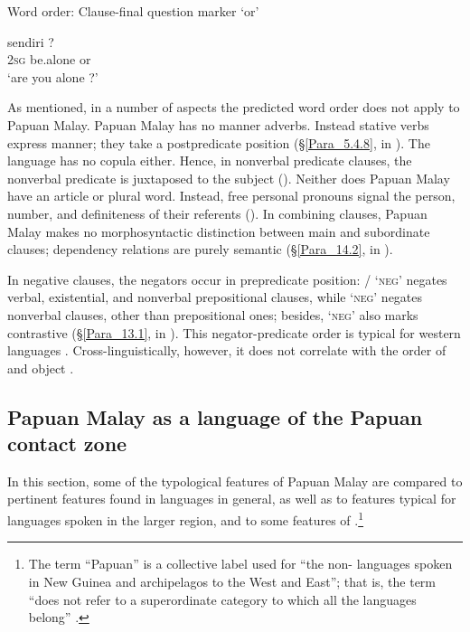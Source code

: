 \begin{styleExampleTitle}
{Word order: Clause-final question marker  ‘or’}
\end{styleExampleTitle}
\ea
\label{Example_1.12}
 {sendiri} {?}\\ %
\textsc{2sg}  be.alone or\\

\glt 
‘are you alone ?’ \textstyleExampleSource{[080921-010-Cv.0003]}
\z


As mentioned, in a number of aspects the predicted word order does not apply to Papuan Malay. Papuan Malay has no manner adverbs. Instead  stative verbs express manner; they take a postpredicate position (§\ref{Para_5.4.8}, in ). The language has no copula either. Hence, in nonverbal predicate clauses, the nonverbal predicate is juxtaposed to the subject (). Neither does Papuan Malay have an article or plural word. Instead, free personal pronouns signal the person, number, and definiteness of their referents (). In combining clauses, Papuan Malay makes no morphosyntactic distinction between main and subordinate clauses; dependency relations are purely semantic (§\ref{Para_14.2}, in ).



In negative clauses, the negators occur in prepredicate position: / ‘\textsc{neg}’ negates verbal, existential, and nonverbal prepositional clauses, while  ‘\textsc{neg}’ negates nonverbal clauses, other than prepositional ones; besides,  ‘\textsc{neg}’ also marks contrastive  (§\ref{Para_13.1}, in ). This negator-predicate order is typical for western  languages \citep[141]{Himmelmann.2005}. Cross-linguistically, however, it does not correlate with the order of  and object \citep[130]{Dryer.2007c}.


\subsection{Papuan Malay as a language of the Papuan contact zone}\label{Para_1.6.2}
In this section, some of the typological features of Papuan Malay are compared to pertinent features found in  languages in general, as well as to features typical for  languages spoken in the larger region, and to some features of .\footnote{\label{Footnote_1.24}The term  ``Papuan'' is a collective label used for  ``the non- languages spoken in New Guinea and archipelagos to the West and East''; that is, the term  ``does not refer to a superordinate category to which all the languages belong'' \citep[107]{Klamer.2008}.}




